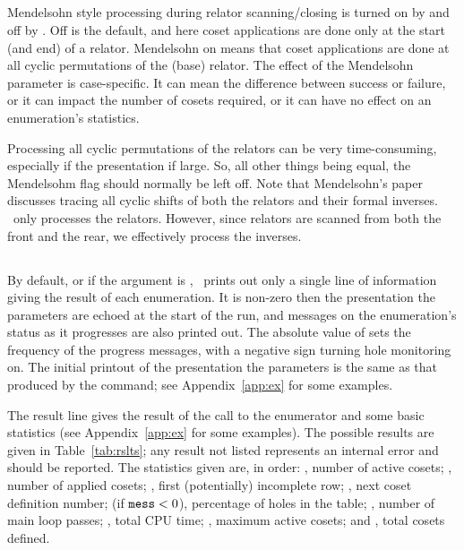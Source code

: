 \subsection{}

Mendelsohn style processing during relator scanning/closing is turned on by
   and off by .
Off is the default, and here coset applications are done only at the start
  (and end) of a relator.
Mendelsohn on means that coset applications are done at all cyclic
  permutations of the (base) relator.
The effect of the Mendelsohn parameter is case-specific.
It can mean the difference between success or failure, or it can impact
  the number of cosets required, or it can have no effect on an
  enumeration's statistics.

Processing all cyclic permutations of the relators can be very
  time-consuming, especially if the presentation if large.
So, all other things being equal, the Mendelsohm flag should normally be
  left off.
Note that Mendelsohn's paper \cite{Men} discusses tracing all cyclic 
  shifts of both the relators and their formal inverses.
\ace\ only processes the relators.
However, since relators are scanned from both the front and the rear, we
  effectively process the inverses.

\subsection{}

By default, or if the argument is , \ace\ prints out only a single
  line of information giving the result of each enumeration.
It  is non-zero then the presentation \amp the parameters are
  echoed at the start of the run, and messages on the enumeration's status
  as it progresses are also printed out.
The absolute value of  sets the frequency of the progress
  messages, with a negative sign turning hole monitoring on.
The initial printout of the presentation \amp the parameters is the same
  as that produced by the  command; see Appendix~\ref{app:ex}
  for some examples.

The result line gives the result of the call to the enumerator and some
  basic statistics (see Appendix~\ref{app:ex} for some examples).
The possible results are given in Table~\ref{tab:rslts}; any result not
  listed represents an internal error and should be reported.
The statistics given are, in order: 
  , number of active cosets; 
  , number of applied cosets;
  , first (potentially) incomplete row;
  , next coset definition number; 
   (if $\texttt{mess} < 0$), percentage of holes in the table;
  , number of main loop passes;
  , total CPU time;
  , maximum active cosets;
  and , total cosets defined.

